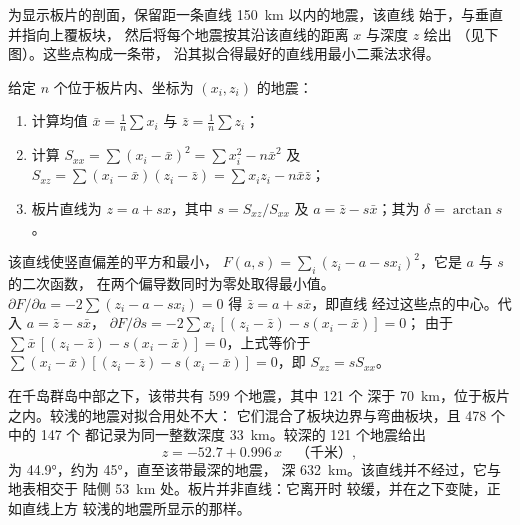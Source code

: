 为显示板片的剖面，保留距一条直线 \qty{150}{km} 以内的地震，该直线
始于，与垂直并指向上覆板块，
然后将每个地震按其沿该直线的距离 $x$ 与深度 $z$ 绘出
（见下图）。这些点构成一条带，
沿其拟合得最好的直线用最小二乘法求得。

\begin{method}[用最小二乘法拟合板片]\label{met:b1:active-margins:lsq}
给定 $n$ 个位于板片内、坐标为 $(x_i, z_i)$ 的地震：
\begin{enumerate}
  \item 计算均值 $\bar x = \frac1n\sum x_i$ 与 $\bar z = \frac1n\sum z_i$；
  \item 计算 $S_{xx} = \sum (x_i - \bar x)^2 = \sum x_i^2 - n\bar x^2$ 及
        $S_{xz} = \sum (x_i - \bar x)(z_i - \bar z) = \sum x_i z_i - n\bar x\bar z$；
  \item 板片直线为 $z = a + s x$，其中 $s = S_{xz}/S_{xx}$ 及
        $a = \bar z - s\bar x$；其为 $\delta = \arctan s$。
\end{enumerate}
\end{method}

该直线使竖直偏差的平方和最小，
$F(a, s) = \sum_i (z_i - a - s x_i)^2$，它是 $a$ 与 $s$ 的二次函数，
在两个偏导数同时为零处取得最小值。$\partial F/\partial a =
-2\sum (z_i - a - s x_i) = 0$ 得 $\bar z = a + s\bar x$，即直线
经过这些点的中心。代入 $a = \bar z - s\bar x$，
$\partial F/\partial s = -2\sum x_i\,[(z_i - \bar z) - s(x_i - \bar x)] = 0$；
由于 $\sum \bar x\,[(z_i - \bar z) - s(x_i - \bar x)] = 0$，上式等价于
$\sum (x_i - \bar x)[(z_i - \bar z) - s(x_i - \bar x)] = 0$，即
$S_{xz} = s S_{xx}$。

在千岛群岛中部之下，该带共有 599 个地震，其中 121 个
深于 \qty{70}{km}，位于板片之内。较浅的地震对拟合用处不大：
它们混合了板块边界与弯曲板块，且 478 个中的 147 个
都记录为同一整数深度 \qty{33}{km}。较深的 121 个地震给出
\[
  z = -52.7 + 0.996\,x \quad\text{（千米）},
\]
为 \ang{44.9}，约为 \ang{45}，直至该带最深的地震，
深 \qty{632}{km}。该直线并不经过，它与地表相交于
陆侧 \qty{53}{km} 处。板片并非直线：它离开时
较缓，并在之下变陡，正如直线上方
较浅的地震所显示的那样。

